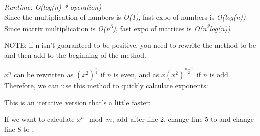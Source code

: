 
\textit{Runtime: O(log(n) * operation)} \\
\indent	Since the multiplication of numbers is \textit{O(1)}, fast expo of numbers is \textit{O(log(n))} \\
\indent Since matrix multiplication is \textit{O(n\textsuperscript{3})}, fast expo of matrices is \textit{O(n\textsuperscript{3}log(n))}

NOTE: if n isn't guaranteed to be positive, you need to rewrite the method to be  and then add  to the beginning of the method.

$x^n$ can be rewritten as $(x^2)^{\frac{n}{2}}$ if $n$ is even, and as $x (x^2)^{\frac{n-1}{2}}$ if $n$ is odd. Therefore, we can use this method to quickly calculate exponents:



This is an iterative version that’s a little faster:



If we want to calculate $x^n \mod m$, add  after line 2, change line 5 to  and change line 8 to .

\newpage